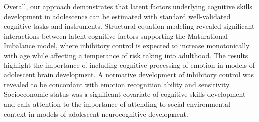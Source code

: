 \documentclass[utf8]{frontiersSCNS} %
\begin{document}
Overall, our approach demonstrates that latent factors underlying cognitive skills development in adolescence can be estimated with standard well-validated cognitive tasks and instruments. Structural equation modeling revealed significant interactions between latent cognitive factors supporting the Maturational Imbalance model, where inhibitory control is expected to increase monotonically with age while affecting a temperance of risk taking into adulthood. The results highlight the importance of including cognitive processing of emotion in models of adolescent brain development. A normative development of inhibitory control was revealed to be concordant with emotion recognition ability and sensitivity. Socioeconomic status was a significant covariate of cognitive skills development and calls attention to the importance of attending to social environmental context in models of adolescent neurocognitive development.
\vspace{2pt}
\end{document}
